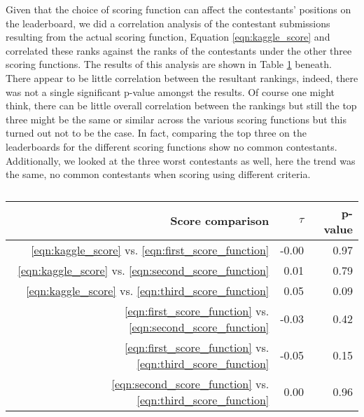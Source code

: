 Given that the choice of scoring function can affect the contestants' positions on the leaderboard, we did a correlation analysis of the contestant submissions resulting from the actual scoring function, Equation \ref{eqn:kaggle_score} and correlated these ranks against the ranks of the contestants under the other three scoring functions. The results of this analysis are shown in Table \ref{tab:kendall_tau_table} beneath. There appear to be little correlation between the resultant rankings, indeed, there was not a single significant p-value amongst the results.  Of course one might think, there can be little overall correlation between the rankings but still the top three might be the same or similar across the various scoring functions but this turned out not to be the case. In fact, comparing the top three on the leaderboards for the different scoring functions show no common contestants. Additionally, we looked at the three worst contestants as well, here the trend was the same, no common contestants when scoring using different criteria. 

\begin{table}[ht]
\centering
\begin{tabular}{rrr}
  \hline
Score comparison & $\tau$ & p-value \\ 
  \hline
\ref{eqn:kaggle_score} vs. \ref{eqn:first_score_function} & -0.00 & 0.97 \\ 
\ref{eqn:kaggle_score} vs. \ref{eqn:second_score_function} & 0.01 & 0.79 \\ 
\ref{eqn:kaggle_score} vs. \ref{eqn:third_score_function} & 0.05 & 0.09 \\ 
\ref{eqn:first_score_function} vs. \ref{eqn:second_score_function} & -0.03 & 0.42 \\ 
\ref{eqn:first_score_function} vs. \ref{eqn:third_score_function}   & -0.05 & 0.15 \\ 
\ref{eqn:second_score_function} vs. \ref{eqn:third_score_function}  & 0.00 & 0.96 \\ 
   \hline
\end{tabular}
\label{tab:kendall_tau_table}
\caption{}
\end{table}



